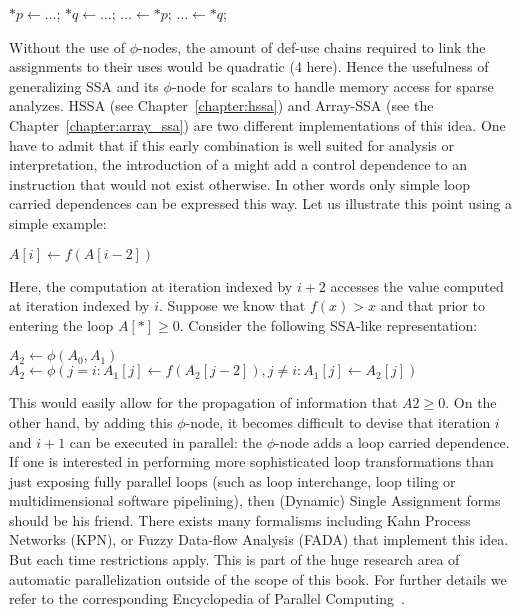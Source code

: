 {
\LinesNotNumbered
\qquad\qquad
\begin{algorithm}[H]
$*p \gets \ldots$; \quad
$*q \gets \ldots$; \quad
$\ldots \gets *p$; \quad
$\ldots \gets *q$;
\end{algorithm}
}

\noindent
Without the use of $\phi$-nodes, the amount of def-use chains required to link the assignments to their uses would be quadratic (4 here). 
Hence the usefulness of generalizing SSA and its $\phi$-node for scalars to handle memory access for sparse analyzes. 
HSSA (see Chapter~\ref{chapter:hssa}) and Array-SSA (see the Chapter~\ref{chapter:array_ssa}) are two different implementations of this idea. 
One have to admit that if this early combination is well suited for analysis or interpretation, the introduction of a \phifun might add a control dependence to an instruction that would not exist otherwise. 
In other words only simple loop carried dependences can be expressed this way. 
Let us illustrate this point using a simple example:

{
\LinesNotNumbered
\begin{algorithm}[H]
   {
    $ A[i] \gets f(A[i-2])$\;
  }
\end{algorithm}
}

\noindent
Here, the computation at iteration indexed by $i+2$ accesses the value computed at iteration indexed by $i$. Suppose we know that $f(x)>x$ and that prior to entering the loop $A[*]\geq 0$.
Consider the following SSA-like representation:

{
\LinesNotNumbered
\begin{algorithm}[H]
   {
    $A_2 \gets \phi(A_0,A_1)$\; 
    $A_2 \gets \phi(j=i : A_1[j] \gets f(A_2[j-2]), j\neq i:A_1[j] \gets A_2[j])$\;
  }
\end{algorithm}
}


\noindent
This would easily allow for the propagation of information that $A2\geq 0$. 
On the other hand, by adding this $\phi$-node, it becomes difficult to devise that iteration $i$ and $i+1$ can be executed in parallel: 
the $\phi$-node adds a loop carried dependence. 
If one is interested in performing more sophisticated loop transformations than just exposing fully parallel loops (such as loop interchange, loop tiling or multidimensional software pipelining), then (Dynamic) Single Assignment forms should be his friend. 
There exists many formalisms including Kahn Process Networks (KPN), or Fuzzy Data-flow Analysis (FADA) that implement this idea. 
But each time restrictions apply. 
This is part of the huge research area of automatic parallelization outside of the scope of this book. 
For further details we refer to the corresponding Encyclopedia of Parallel Computing~\cite{Padua}.
